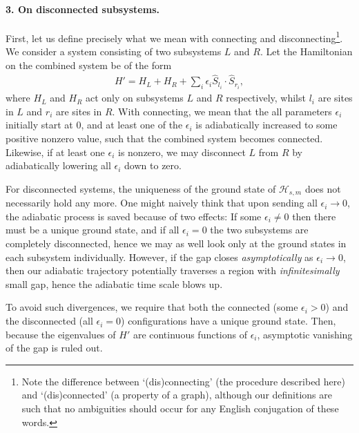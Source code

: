 \paragraph{3. On disconnected subsystems.} 
First, let us define precisely what we mean with connecting and disconnecting\footnote{Note the difference between `(dis)connecting' (the procedure described here) and `(dis)connected' (a property of a graph), although our definitions are such that no ambiguities should occur for any English conjugation of these words.}.
We consider a system consisting of two subsystems $L$ and $R$. %
Let the Hamiltonian on the combined system be of the form 
\begin{align}
H' = H_L + H_R + \sum_{i} \epsilon_i \hat{S}_{l_i} \cdot \hat{S}_{r_i},
\label{eqn:connecting}
\end{align}
where $H_L$ and $H_R$ act only on subsystems $L$ and $R$ respectively, whilst $l_i$ are sites in $L$ and $r_i$ are sites in $R$. With connecting, we mean that the all parameters $\epsilon_i$ initially start at $0$, and at least one of the $\epsilon_i$ is adiabatically increased to some positive nonzero value, such that the combined system becomes connected. Likewise, if at least one $\epsilon_i$ is nonzero, we may disconnect $L$ from $R$ by adiabatically lowering all $\epsilon_i$ down to zero. 

For disconnected systems, the uniqueness of the ground state of $\mathcal{H}_{s,m}$ does not necessarily hold any more. One might naively think that upon sending all $\epsilon_i \rightarrow 0$, the adiabatic process is saved because of two effects: If some $\epsilon_i \neq 0$ then there must be a unique ground state, and if all $\epsilon_i = 0$ the two subsystems are completely disconnected, hence we may as well look only at the ground states in each subsystem individually. However, if the gap closes \emph{asymptotically} as $\epsilon_i \rightarrow 0$, then our adiabatic trajectory potentially traverses a region with \emph{infinitesimally} small gap, hence the adiabatic time scale blows up. 

To avoid such divergences, we require that both the connected (some $\epsilon_i > 0$) and the disconnected (all $\epsilon_i = 0$) configurations have a unique ground state. Then, because the eigenvalues of $H'$ are continuous functions of $\epsilon_i$, asymptotic vanishing of the gap is ruled out. 

